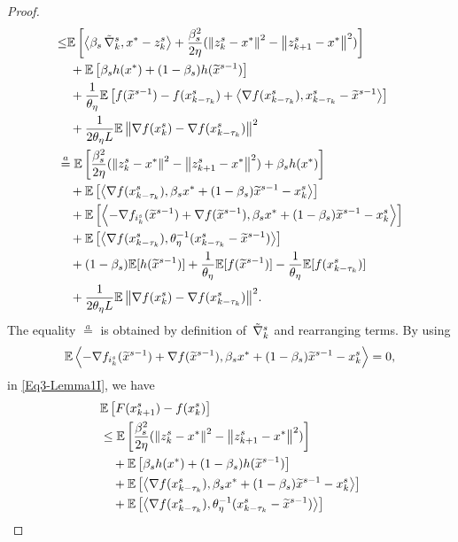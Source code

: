 \begin{proof}
\begin{gather}
\begin{split}
&{\leq}\E\left[\Iprod{\beta_s\VRG}{x^* - z_{k}^s}+{\frac{\beta_s^2}{2\eta}}(\norm{z_{k}^s-x^*}^2-\norm{z_{k+1}^s-x^*}^2)\right]\\
&~~~+\E\left[\beta_s h(x^*)+(1-\beta_s) h(\widetilde{x}^{s-1})\right]\\
&~~~+\frac{1}{\theta_{\eta}}\E\left[f(\widetilde{x}^{s-1})-f(x_{k-\tau_k}^s)+\Iprod{\nabla f(x_{k-\tau_k}^s)}{x_{k-\tau_k}^s-\widetilde{x}^{s-1}}\right]\\
&~~~+{\frac{1}{2 \theta_{\eta} L} \E\norm{\nabla f(x_{k}^s)-\nabla f(x_{k-\tau_k}^s)}^2}\\
& \stackrel{a}{=} \E\left[{\frac{ \beta_s^2}{2\eta}}(\norm{z_{k}^s-x^*}^2-\norm{z_{k+1}^s-x^*}^2)+\beta_sh(x^*)\right]\\
&~~~+\E\left[\Iprod{\nabla f(x_{k-\tau_k}^s)}{\beta_sx^*+(1-\beta_s)\widetilde{x}^{s-1}-{x}^{s}_{k}}\right]\\
&~~~+\E\left[\Iprod{-\nabla f_{i_k^s}(\widetilde{x}^{s-1})+\nabla f(\widetilde{x}^{s-1})}{\beta_sx^*+(1-\beta_s)\widetilde{x}^{s-1}-x_{k}^{s}}\right]\\
&~~~+\E\left[\Iprod{\nabla f(x_{k-\tau_k}^s)}{\theta_{\eta}^{-1}(x_{k-\tau_k}^s-\widetilde{x}^{s-1})}\right]\\
&~~~+(1-\beta_s) \E[h(\widetilde{x}^{s-1})]+\frac{1}{\theta_{\eta}}\E[f(\widetilde{x}^{s-1})]-\frac{1}{\theta_{\eta}}\E[f({x}^{s}_{k-\tau_k})]\\
&~~~+{\frac{1}{2 \theta_{\eta} L} \E\norm{\nabla f(x_{k}^s)-\nabla f(x_{k-\tau_k}^s)}^2}.
\end{split}
\raisetag{18pt}
\end{gather}
The equality $\stackrel{a}{=}$ is obtained by definition of $\,\tilde{\nabla}_k^s$ and rearranging terms. By using    
\[
\mathbb{E}\left\langle -\nabla f_{i_k^s}(\widetilde{x}^{s-1})+\nabla f(\widetilde{x}^{s-1}),\beta_sx^*+(1-\beta_s)\widetilde{x}^{s-1}-x_{k}^{s}\right\rangle=0,
\]
in \eqref{Eq3-Lemma1I}, we have
\begin{equation}\label{Eq3-Lemma1}
\begin{split}
&\E\left[F(x_{k+1}^s) -f(x_{k}^s)\right]\\
&\leq\E\left[{\frac{ \beta_s^2}{2\eta}}(\norm{z_{k}^s-x^*}^2-\norm{z_{k+1}^s-x^*}^2)\right]\\
&~~~+\E\left[\beta_sh(x^*)+(1-\beta_s) h(\widetilde{x}^{s-1})\right]\\
&~~~+\E\left[\Iprod{\nabla f(x_{k-\tau_k}^s)}{\beta_sx^*+(1-\beta_s)\widetilde{x}^{s-1}-{x}^{s}_{k}}\right]\\
&~~~+\E\left[\Iprod{\nabla f(x_{k-\tau_k}^s)}{\theta_{\eta}^{-1}(x_{k-\tau_k}^s-\widetilde{x}^{s-1})}\right]\\

\end{split}
\end{equation}
\end{proof}
